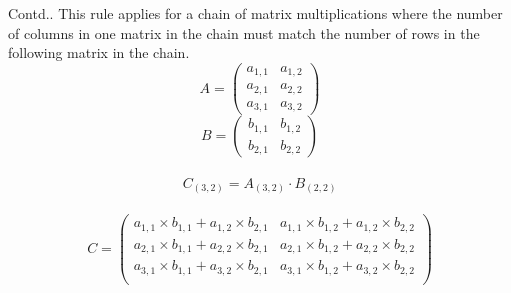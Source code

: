 \documentclass{beamer}
\begin{document}
\begin{frame}
\begin{block}{Contd..}
This rule applies for a chain of matrix multiplications where the number of columns in one matrix in the chain must match the number of rows in the following matrix in the chain.
    \begin{equation*}
   		A = \begin{pmatrix}
   				a_{1,1} & a_{1,2} \\
   				a_{2,1} & a_{2,2} \\
   				a_{3,1} & a_{3,2} 
   			\end{pmatrix}
   	\end{equation*}
   	\begin{equation*}
   		B = \begin{pmatrix}
   				b_{1,1} & b_{1,2} \\
   				b_{2,1} & b_{2,2} 
   			\end{pmatrix}
   	\end{equation*}\\
   	\begin{equation*}
   		C_{(3, 2)} = A_{(3, 2)} \cdot B_{(2, 2)}
   	\end{equation*}\\
   	\begin{equation*}
   		C = \begin{pmatrix}
   				a_{1,1} \times b_{1,1} + a_{1,2} \times b_{2,1} & a_{1,1} \times b_{1,2} + a_{1,2} \times b_{2,2}  \\
    			a_{2,1} \times b_{1,1} + a_{2,2} \times b_{2,1} & a_{2,1} \times b_{1,2} + a_{2,2} \times b_{2,2}  \\
    			a_{3,1} \times b_{1,1} + a_{3,2} \times b_{2,1} & a_{3,1} \times b_{1,2} + a_{3,2} \times b_{2,2}  \\ 
   			\end{pmatrix}
   	\end{equation*}
\end{block}
\end{frame}
\end{document}
